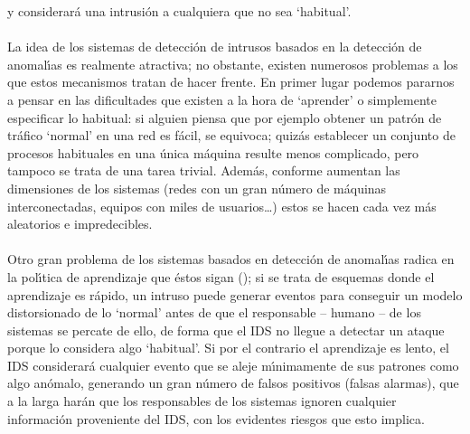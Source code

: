 y considerar\'a una intrusi\'on a cualquiera que no sea `habitual'.\\
\\La idea de los sistemas de detecci\'on de intrusos basados en la detecci\'on 
de anomal\'{\i}as es realmente atractiva; no obstante, existen numerosos 
problemas a los que estos mecanismos tratan de hacer frente. En primer lugar 
podemos pararnos a pensar en las dificultades que existen a la hora de 
`aprender' o simplemente especificar lo habitual:
si alguien piensa que por ejemplo obtener un patr\'on de tr\'afico `normal' en 
una red es f\'acil, se equivoca; quiz\'as establecer un conjunto de procesos
habituales en una \'unica m\'aquina resulte menos complicado, pero tampoco se 
trata de una tarea trivial. Adem\'as, conforme aumentan las dimensiones de los
sistemas (redes con un gran n\'umero de m\'aquinas interconectadas, equipos con
miles de usuarios\ldots) estos se hacen cada vez m\'as aleatorios e 
impredecibles.\\
\\Otro gran problema de los sistemas basados en detecci\'on de anomal\'{\i}as
radica en la pol\'{\i}tica de aprendizaje que \'estos sigan (\cite{kn:ran98}); 
si se trata de 
esquemas donde el aprendizaje es r\'apido, un intruso puede generar eventos 
para conseguir un modelo distorsionado de lo `normal' antes de que el 
responsable -- humano -- de los sistemas se percate de ello, de forma que el 
IDS no llegue a detectar un ataque porque lo considera algo `habitual'. Si por
el contrario el aprendizaje es lento, el IDS considerar\'a cualquier evento que
se aleje m\'{\i}nimamente de sus patrones como algo an\'omalo, generando un
gran n\'umero de falsos positivos (falsas alarmas), que a la larga har\'an que
los responsables de los sistemas ignoren cualquier informaci\'on proveniente del
IDS, con los evidentes riesgos que esto implica.
